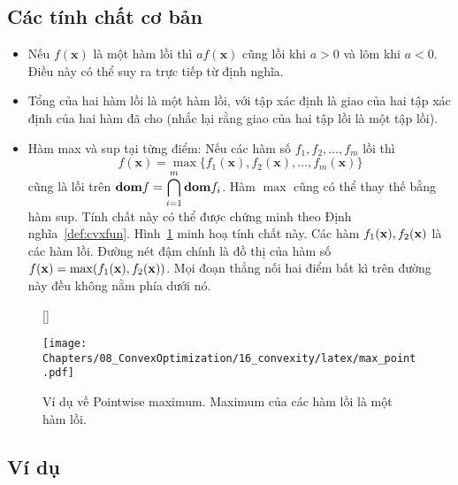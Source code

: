 \subsection{Các tính chất cơ bản}
\label{ssub:16_properties}
\begin{itemize}
\item Nếu $f(\mathbf{x})$ là một hàm lồi thì $af(\mathbf{x})$ cũng lồi khi $a > 0$ và lõm khi $a < 0$. Điều này có
thể suy ra trực tiếp từ định nghĩa.

\item Tổng của hai {hàm lồi} là một {hàm lồi}, với tập xác
định là giao của hai tập xác định của hai hàm đã cho (nhắc lại rằng giao của
hai tập lồi là một tập lồi).
\item {Hàm max và sup tại từng điểm}: Nếu các hàm số $f_1, f_2,
\dots, f_m$ lồi thì
\begin{equation*}
f(\mathbf{x}) = \max\{f_1(\mathbf{x}), f_2(\mathbf{x}), \dots, f_m(\mathbf{x})\}
\end{equation*}
cũng là lồi trên $\displaystyle \boldsymbol{\mathbf{dom}} f = \bigcap_{i=1}^m \boldsymbol{\mathbf{dom}} f_i$. Hàm $\max$ cũng có thể thay thế bằng hàm
{sup}. Tính chất này có thể được chứng minh theo
Định nghĩa~\ref{def:cvxfun}. Hình~\ref{fig:16_max_point} minh hoạ tính chất
này. Các hàm $f_1(\mathbf{x}), f_2(\mathbf{x})$ là các hàm lồi. Đường nét đậm chính là đồ
thị của hàm số $f(\mathbf{x}) = \max(f_1(\mathbf{x}), f_2(\mathbf{x}))$. Mọi đoạn thẳng nối hai
điểm bất kì trên đường này đều {không nằm phía dưới} nó.

\end{itemize}

\begin{figure}[t]
[\FBwidth]
{\caption{Ví dụ về Pointwise maximum. Maximum của các hàm lồi là một hàm lồi.}
\label{fig:16_max_point}}
{\texttt{[image: Chapters/08\_ConvexOptimization/16\_convexity/latex/max\_point.pdf]}}
\end{figure}


\subsection{Ví dụ}

